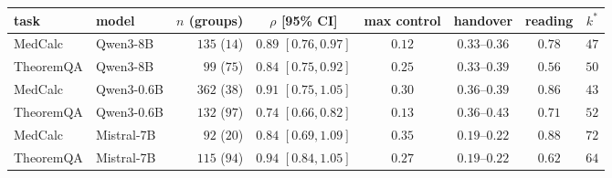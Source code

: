 \begin{tabular}{@{}llrccccc@{}}
\toprule
task & model & $n$ (groups) & $\rho$ [95\% CI] & max control & handover & reading & $k^{*}$ \\
\midrule
MedCalc & Qwen3-8B & $135$ ($14$) & $0.89$ $[0.76,0.97]$ & $0.12$ & $0.33$--$0.36$ & $0.78$ & $47$ \\
TheoremQA & Qwen3-8B & $99$ ($75$) & $0.84$ $[0.75,0.92]$ & $0.25$ & $0.33$--$0.39$ & $0.56$ & $50$ \\
MedCalc & Qwen3-0.6B & $362$ ($38$) & $0.91$ $[0.75,1.05]$ & $0.30$ & $0.36$--$0.39$ & $0.86$ & $43$ \\
TheoremQA & Qwen3-0.6B & $132$ ($97$) & $0.74$ $[0.66,0.82]$ & $0.13$ & $0.36$--$0.43$ & $0.71$ & $52$ \\
MedCalc & Mistral-7B & $92$ ($20$) & $0.84$ $[0.69,1.09]$ & $0.35$ & $0.19$--$0.22$ & $0.88$ & $72$ \\
TheoremQA & Mistral-7B & $115$ ($94$) & $0.94$ $[0.84,1.05]$ & $0.27$ & $0.19$--$0.22$ & $0.62$ & $64$ \\
\bottomrule
\end{tabular}
